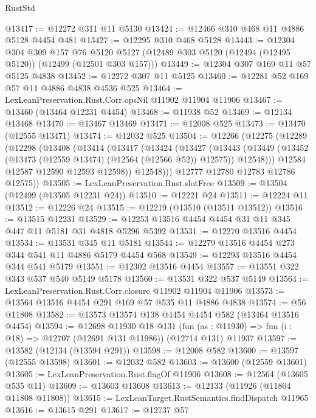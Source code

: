 \begin{lexlean}{RustStd}
\begin{coremodule}
{\begin{coremodule}
{{{{{{{{{{{{{{{{{{{{{{{{{{{{{{{{{{{{{{{{{{{{{{{{{{{{{{{{{{{{{{{{{{{{{{{{{{{{{{{{@13417 := @12272 @311 @11 @5130
@13424 := @12466 @310 @468 @11 @4886 @5128 @4454 @481
@13427 := @12295 @310 @468 @5128
@13443 := @12304
    @304
    @309
    @157
    @76
    @5120
    @5127
    (@12489 @303 @5120 (@12494 (@12495 @5120)) (@12499 (@12501 @303 @157)))
@13449 := @12304 @307 @169 @11 @57 @5125 @4838
@13452 := @12272 @307 @11 @5125
@13460 := @12281 @52 @169 @57 @11 @4886 @4838 @4536 @525
@13464 := LexLeanPreservation.Rust.Corr.opsNil @11902 @11904 @11906
@13467 := @13460 (@13464 @12231 @4454)
@13468 := @11938 @52
@13469 := @12134 @13468
@13470 := @13467 @13469
@13471 := @12008 @525
@13473 := @13470 (@12555 @13471)
@13474 := @12032 @525
@13504 := @12266
    (@12275
      (@12289
        (@12298
          (@13408
            (@13414
              (@13417
                (@13424
                  (@13427
                    (@13443
                      (@13449
                        (@13452 (@13473 (@12559 @13474) (@12564 (@12566 @52)) @12575))
                        @12548)))
                  @12584
                  @12587
                  @12590
                  @12593
                  @12598))
              @12548)))
        @12777
        @12780
        @12783
        @12786
        @12575))
@13505 := LexLeanPreservation.Rust.slotFree
@13509 := @13504 (@12499 (@13505 @12231 @24))
@13510 := @12221 @24
@13511 := @12224 @11
@13512 := @12226 @24
@13515 := @12219 (@13510 (@13511 @13512))
@13516 := @13515 @12231
@13529 := @12253 @13516 @4454 @4454 @31 @11 @345 @447 @11 @5181 @31 @4818 @5296 @5392
@13531 := @12270 @13516 @4454
@13534 := @13531 @345 @11 @5181
@13544 := @12279 @13516 @4454 @273 @344 @541 @11 @4886 @5179 @4454 @568
@13549 := @12293 @13516 @4454 @344 @541 @5179
@13551 := @12302 @13516 @4454
@13557 := @13551 @322 @343 @537 @540 @5149 @5178
@13560 := @13531 @322 @537 @5149
@13564 := LexLeanPreservation.Rust.Corr.closure @11902 @11904 @11906
@13573 := @13564 @13516 @4454 @291 @169 @57 @535 @11 @4886 @4838
@13574 := @56 @11808
@13582 := @13573 @13574 @138 @4454 @4454 @582 (@13464 @13516 @4454)
@13594 := @12698
    @11930
    @18
    @131
    (fun (as : @11930) => fun (i : @18) => @12707 (@12691 @131 @11986))
    (@12714 @131)
    @11937
@13597 := @13582 (@12134 (@13594 @291))
@13598 := @12008 @582
@13600 := @13597 (@12555 @13598)
@13601 := @12032 @582
@13603 := @13600 (@12559 @13601)
@13605 := LexLeanPreservation.Rust.flagOf @11906
@13608 := @12564 (@13605 @535 @11)
@13609 := @13603 @13608
@13613 := @12133 (@11926 (@11804 @11808 @11808))
@13615 := LexLeanTarget.RustSemantics.findDispatch @11965
@13616 := @13615 @291
@13617 := @12737 @57
}}}}}}}}}}}}}}}}}}}}}}}}}}}}}}}}}}}}}}}}}}}}}}}}}}}}}}}}}}}}}}}}}}}}}}}}}}}}}}}}
\end{coremodule}}
\end{coremodule}
\end{lexlean}
